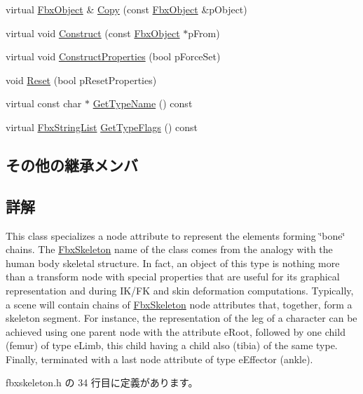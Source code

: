 \begin{DoxyCompactItemize}
\item 
virtual \hyperlink{class_fbx_object}{Fbx\+Object} \& \hyperlink{class_fbx_skeleton_a86ed7d693e2f77267a7e07c0db5023d7}{Copy} (const \hyperlink{class_fbx_object}{Fbx\+Object} \&p\+Object)
\item 
virtual void \hyperlink{class_fbx_skeleton_a76c2cdc12c50e753bf2510aa9c18c594}{Construct} (const \hyperlink{class_fbx_object}{Fbx\+Object} $\ast$p\+From)
\item 
virtual void \hyperlink{class_fbx_skeleton_aa1e8d4dbe577415b4e00914ae75d46a0}{Construct\+Properties} (bool p\+Force\+Set)
\item 
void \hyperlink{class_fbx_skeleton_a1ffc5d46440a35d2ddfa75f20918c1b4}{Reset} (bool p\+Reset\+Properties)
\item 
virtual const char $\ast$ \hyperlink{class_fbx_skeleton_a95bceb7989084e51a450525b4f57698b}{Get\+Type\+Name} () const
\item 
virtual \hyperlink{class_fbx_string_list}{Fbx\+String\+List} \hyperlink{class_fbx_skeleton_a8407f2dbece8af886d80b5a024626d54}{Get\+Type\+Flags} () const
\end{DoxyCompactItemize}
\subsection*{その他の継承メンバ}


\subsection{詳解}
This class specializes a node attribute to represent the elements forming \char`\"{}bone\char`\"{} chains. The \hyperlink{class_fbx_skeleton}{Fbx\+Skeleton} name of the class comes from the analogy with the human body skeletal structure. In fact, an object of this type is nothing more than a transform node with special properties that are useful for its graphical representation and during I\+K/\+FK and skin deformation computations. Typically, a scene will contain chains of \hyperlink{class_fbx_skeleton}{Fbx\+Skeleton} node attributes that, together, form a skeleton segment. For instance, the representation of the leg of a character can be achieved using one parent node with the attribute e\+Root, followed by one child (femur) of type e\+Limb, this child having a child also (tibia) of the same type. Finally, terminated with a last node attribute of type e\+Effector (ankle). 

 fbxskeleton.\+h の 34 行目に定義があります。



